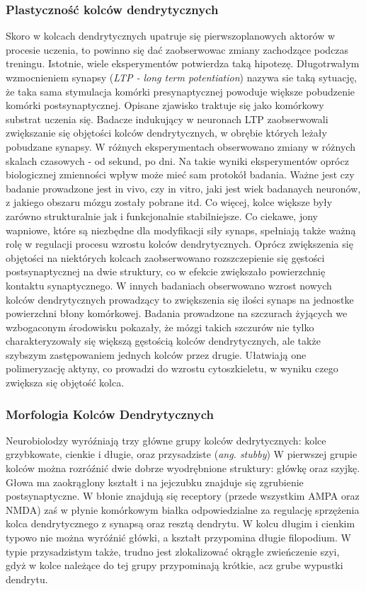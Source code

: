 \documentclass{article}
\begin{document}
\subsubsection{Plastyczność kolców dendrytycznych}
Skoro w kolcach dendrytycznych upatruje się pierwszoplanowych aktorów w procesie uczenia, to powinno się dać zaobserwowac zmiany zachodzące podczas treningu.
Istotnie, wiele eksperymentów potwierdza taką hipotezę.
Długotrwałym wzmocnieniem synapsy (\emph{LTP - long term potentiation}) nazywa sie taką sytuację, że taka sama stymulacja komórki presynaptycznej powoduje większe pobudzenie komórki postsynaptycznej.
Opisane zjawisko traktuje się jako komórkowy substrat uczenia się.
Badacze indukujący w neuronach LTP zaobserwowali zwiększanie się objętości kolców dendrytycznych, w obrębie których leżały pobudzane synapsy.
W różnych eksperymentach obserwowano zmiany w różnych skalach czasowych - od sekund, po dni.
Na takie wyniki eksperymentów oprócz biologicznej zmienności wpływ może mieć sam protokół badania.%
Ważne jest czy badanie prowadzone jest in vivo, czy in vitro, jaki jest wiek badanaych neuronów, z jakiego obszaru mózgu zostały pobrane itd.
Co więcej, kolce większe były zarówno strukturalnie jak i funkcjonalnie stabilniejsze.
Co ciekawe, jony wapniowe, które są niezbędne dla modyfikacji siły synaps, spełniają także ważną rolę w regulacji procesu wzrostu kolców dendrytycznych.
Oprócz zwiększenia się objętości na niektórych kolcach zaobserwowano rozszczepienie się gęstości postsynaptycznej na dwie struktury, co w efekcie zwiększało powierzchnię kontaktu synaptycznego.
W innych badaniach obserwowano wzrost nowych kolców dendrytycznych prowadzący to zwiększenia się ilości synaps na jednostke powierzchni błony komórkowej.
Badania prowadzone na szczurach żyjących we wzbogaconym środowisku pokazały, że mózgi takich szczurów nie tylko charakteryzowały się większą gęstością kolców dendrytycznych, ale także szybszym zastępowaniem jednych kolców przez drugie.
Ułatwiają one polimeryzację aktyny, co prowadzi do wzrostu cytoszkieletu, w wyniku czego zwiększa się objętość kolca\cite{Costa2007}. 

\subsubsection{Morfologia Kolców Dendrytycznych}
Neurobiolodzy wyróźniają trzy główne grupy kolców dedrytycznych: kolce grzybkowate, cienkie i długie, oraz przysadziste (\emph{ang. stubby})
W pierwszej grupie kolców można rozróźnić dwie dobrze wyodrębnione struktury: główkę oraz szyjkę.
Głowa ma zaokrąglony kształt i na jejczubku znajduje się zgrubienie postsynaptyczne.
W błonie znajdują się receptory (przede wszystkim AMPA oraz NMDA) zaś w płynie komórkowym białka odpowiedzialne za regulację sprzężenia kolca dendrytycznego z synapsą oraz resztą dendrytu. %
W kolcu długim i cienkim typowo nie można wyróźnić główki, a kształt przypomina długie filopodium.
W typie przysadzistym także, trudno jest zlokalizować okrągłe zwieńczenie szyi, gdyż w kolce należące do tej grupy przypominają krótkie, acz grube wypustki dendrytu. %
\cite{Sala2014}
\cite{Costa2007}
\end{document}
